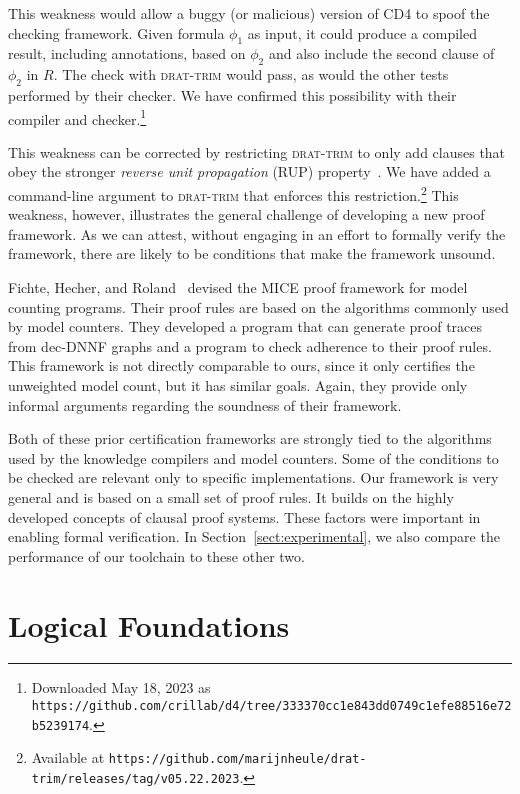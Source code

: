 \documentclass[twoside,11pt]{article}
\newcommand{\url}[1]{\texttt{#1}}
\newcommand{\progname}[1]{\textsc{#1}}
\newcommand{\cdfour}{\progname{CD4}}
\newcommand{\dtrim}{\progname{drat-trim}}
\begin{document}
This weakness would allow a buggy (or malicious) version of \cdfour{}
to spoof the checking framework.  Given formula $\phi_1$ as input, it
could produce a compiled result, including annotations, based on $\phi_2$ and also include the second clause of $\phi_2$ in $R$.
The check with \dtrim{} would pass, as would the other tests performed
by their checker.  We have confirmed this possibility with
their compiler and checker.\footnote{Downloaded May 18, 2023 as\\
\url{https://github.com/crillab/d4/tree/333370cc1e843dd0749c1efe88516e72b5239174}.}


This weakness can be corrected by restricting \dtrim{} to only add
clauses that obey the stronger \emph{reverse unit propagation} (RUP) property~\cite{goldberg,vangelder08_verifying_rup_proofs}.  We have added a
command-line argument to \dtrim{} that enforces this
restriction.\footnote{Available at
\url{https://github.com/marijnheule/drat-trim/releases/tag/v05.22.2023}.}  This weakness, however, illustrates the general challenge of
developing a new proof framework.
As we can attest,
without engaging in an effort to formally verify the framework, there are likely to be
conditions that make the framework unsound.

Fichte, Hecher, and Roland~\cite{fichte:sat:2022} devised the MICE
proof framework for model counting programs.  Their proof rules are
based on the algorithms commonly used by model counters.  They
developed a program that can generate proof traces from dec-DNNF
graphs and a program to check adherence to their proof rules.  This
framework is not directly comparable to ours, since it only certifies
the unweighted model count, but it has similar goals.
Again, they provide only  informal arguments
regarding the soundness of their framework.

Both of these prior certification frameworks are strongly tied to the
algorithms used by the knowledge compilers and model counters.  Some
of the conditions to be checked are relevant only to specific
implementations.    Our framework is very general and is based on a small set
of proof rules.  It builds on the highly developed
concepts of clausal proof systems.  These factors were important in enabling formal verification.
In Section~\ref{sect:experimental},
we also compare the performance of our toolchain to these other two.


\section{Logical Foundations}
\label{section:logical:foundations}
\end{document}
